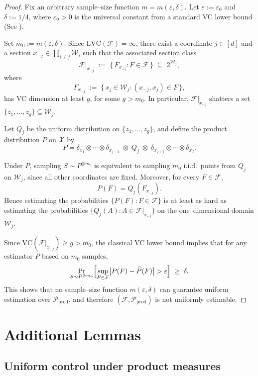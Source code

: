 \documentclass[arxiv]{colt2026}
\newcommand{\X}{\mathcal{X}}
\newcommand{\F}{\mathcal{F}}
\newcommand{\W}{\mathcal{W}}
\newcommand{\Pc}{\mathcal{P}}
\newcommand{\eps}{\varepsilon}
\newcommand{\VC}{\mathrm{VC}}
\newcommand{\LVC}{\mathrm{LVC}}
\begin{document}
\begin{proof}
Fix an arbitrary sample--size function $m=m(\eps,\delta)$.
Let $\eps:=\eps_0$ and $\delta:=1/4$, where $\eps_0>0$ is the universal constant from a
standard VC lower bound (See \cite{shalev2014understanding, blumer1989}).

Set $m_0:=m(\eps,\delta)$.
Since $\LVC(\F)=\infty$, there exist a coordinate $j\in[d]$ and a section
$x_{-j}\in \prod_{i\neq j}\W_i$ such that the associated section class
\[
\F|_{x_{-j}}
\;:=\;
\bigl\{\,F_{x_{-j}} : F\in\F\,\bigr\}
\;\subseteq\;
2^{\W_j},
\]
where
\[
F_{x_{-j}}
\;:=\;
\bigl\{\,x_j\in\W_j : (x_{-j},x_j)\in F\,\bigr\},
\]
has VC dimension at least $g$, for some $g>m_0$.
In particular, $\F|_{x_{-j}}$ shatters a set
$\{z_1,\ldots,z_g\}\subseteq\W_j$.

Let $Q_j$ be the uniform distribution on $\{z_1,\ldots,z_g\}$, and define the
product distribution $P$ on $\X$ by
\[
P
=
\delta_{x_1}\otimes\cdots\otimes \delta_{x_{j-1}}
\;\otimes\;
Q_j
\;\otimes\;
\delta_{x_{j+1}}\otimes\cdots\otimes \delta_{x_d}.
\]

Under $P$, sampling $S\sim P^{\otimes m_0}$ is equivalent to sampling
$m_0$ i.i.d.\ points from $Q_j$ on $\W_j$, since all other coordinates are fixed.
Moreover, for every $F\in\F$,
\[
P(F)
=
Q_j\!\left(F_{x_{-j}}\right).
\]
Hence estimating the probabilities $\{P(F):F\in\F\}$ is at least as hard as
estimating the probabilities
$\{Q_j(A):A\in \F|_{x_{-j}}\}$ on the one--dimensional domain $\W_j$.

Since $\VC(\F|_{x_{-j}})\ge g>m_0$, the classical VC lower bound implies that for
any estimator $\widehat P$ based on $m_0$ samples,
\[
\Pr_{S\sim P^{\otimes m_0}}
\Bigl[
\sup_{F\in\F}\bigl|P(F)-\widehat P(F)\bigr|>\eps
\Bigr]
\;\ge\;\delta.
\]
This shows that no sample--size function $m(\eps,\delta)$ can guarantee uniform
estimation over $\Pc_{\mathrm{prod}}$, and therefore $(\F,\Pc_{\mathrm{prod}})$ is
not uniformly estimable.
\end{proof}



\section{Additional Lemmas}

\subsection{Uniform control under product measures}
\end{document}
